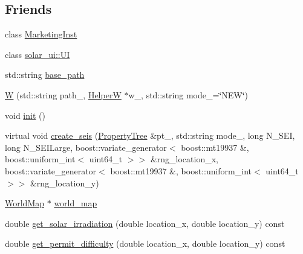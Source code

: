 \subsection*{Friends}
\begin{DoxyCompactItemize}
\item 
class \hyperlink{classsolar__core_1_1_w_ac01e54f17f927af30196b551d235d7ba}{Marketing\+Inst}
\item 
class \hyperlink{classsolar__core_1_1_w_a8f3690c82c493af3a66f999410fe891d}{solar\+\_\+ui\+::\+U\+I}
\end{DoxyCompactItemize}
\begin{DoxyCompactItemize}
\item 
std\+::string \hyperlink{classsolar__core_1_1_w_acf6e7dd195573ba04b406cde2e5b80fb}{base\+\_\+path}
\item 
\hyperlink{classsolar__core_1_1_w_a969ad4de57020878a91873868c9bdb45}{W} (std\+::string path\+\_\+, \hyperlink{classsolar__core_1_1_helper_w}{Helper\+W} $\ast$w\+\_\+, std\+::string mode\+\_\+=\char`\"{}N\+E\+W\char`\"{})
\item 
void \hyperlink{classsolar__core_1_1_w_af58a19a39fb9fb34258803c613924613}{init} ()
\item 
virtual void \hyperlink{classsolar__core_1_1_w_a0b92657c681579dacc29821f41650541}{create\+\_\+seis} (\hyperlink{namespacesolar__core_adeda2737d6938c190eb774a5b2495045}{Property\+Tree} \&pt\+\_\+, std\+::string mode\+\_\+, long N\+\_\+\+S\+E\+I, long N\+\_\+\+S\+E\+I\+Large, boost\+::variate\+\_\+generator$<$ boost\+::mt19937 \&, boost\+::uniform\+\_\+int$<$ uint64\+\_\+t $>$$>$ \&rng\+\_\+location\+\_\+x, boost\+::variate\+\_\+generator$<$ boost\+::mt19937 \&, boost\+::uniform\+\_\+int$<$ uint64\+\_\+t $>$$>$ \&rng\+\_\+location\+\_\+y)
\end{DoxyCompactItemize}
\begin{DoxyCompactItemize}
\item 
\hyperlink{classsolar__core_1_1_world_map}{World\+Map} $\ast$ \hyperlink{classsolar__core_1_1_w_a8ed6f1aa7fd4ef2c3488147b38a670b7}{world\+\_\+map}
\item 
double \hyperlink{classsolar__core_1_1_w_af3adfe566e6db1a7f7df18aa7df22c25}{get\+\_\+solar\+\_\+irradiation} (double location\+\_\+x, double location\+\_\+y) const 
\item 
double \hyperlink{classsolar__core_1_1_w_a7906874c5180d8114e1acba095ace3f5}{get\+\_\+permit\+\_\+difficulty} (double location\+\_\+x, double location\+\_\+y) const 
\end{DoxyCompactItemize}



